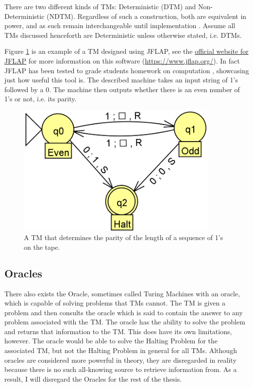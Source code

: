 There are two different kinds of TMs: Deterministic (DTM) and Non-Deterministic (NDTM).
Regardless of such a construction, both are equivalent in power, and as such remain interchangeable until implementation \cite{NDTMeqDTM}.
Assume all TMs discussed henceforth are Deterministic unless otherwise stated, i.e. DTMs.

Figure \ref{fig:TM} is an example of a TM designed using JFLAP, see the \href{https://www.jflap.org/}{official website for JFLAP} for more information on this software (\href{https://www.jflap.org/}{https://www.jflap.org/}).
In fact JFLAP has been tested to grade students homework on computation \cite{JFLAPGrading}, showcasing just how useful this tool is.
The described machine takes an input string of 1's followed by a 0.
The machine then outputs whether there is an even number of 1's or not, i.e. its parity.

\begin{figure}[htb]
    \centering
    \includegraphics[width=10cm]{Images/SampleTMCrop.png}
       \caption{A TM that determines the parity of the length of a sequence of 1's on the tape.}
           \label{fig:TM}
\end{figure}

\subsection{Oracles}\label{subsec:Oracles}

There also exists the Oracle, sometimes called Turing Machines with an oracle, which is capable of solving problems that TMs cannot.
The TM is given a problem and then consults the oracle which is said to contain the answer to any problem associated with the TM.
The oracle has the ability to solve the problem and returns that information to the TM.
This does have its own limitations, however.
The oracle would be able to solve the Halting Problem for the associated TM, but not the Halting Problem in general for all TMs.
Although oracles are considered more powerful in theory, they are disregarded in reality because there is no such all-knowing source to retrieve information from.
As a result, I will disregard the Oracles for the rest of the thesis.

